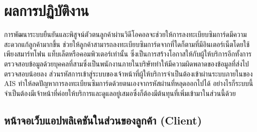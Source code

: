 \chapter{ผลการปฏิบัติงาน}
\label{chapter:result}

การพัฒนาระบบยืนยันและพิสูจน์ตัวตนลูกค้าผ่านวิดีโอคอลจะช่วยให้การลงทะเบียบซิมการ์ดมีความสะดวกแก้ลูกค้ามากขึ้น ช่วยให้ลูกค้าสามารถลงทะเบียบซิมการ์ดจากที่ใดก็ตามที่มีอินเตอร์เน็ตโดยใช้เพียงสมาร์ทโฟน แท็บเล็ตหรือคอมพิวเตอร์เท่านั้น ซึ่งเป็นการสร้างโอกาสให้กับผู้ให้บริการอีกทั้งการตรวจสอบข้อมูลด้วยบุคคลที่สามซึ่งเป็นพนักงานภายในบริษัททำให้มีความผิดพลาดของข้อมูลที่ส่งไปตรวจสอบน้อยลง ส่วนรหัสการเข้าสู่ระบบของเจ้าหน้าที่ผู้ให้บริการจำเป็นต้องเข้าผ่านระบบภายในของ AIS ทำให้ลดปัญหาการลงทะเบียนซิมการ์ดด้วยตนเองจากรหัสผ่านที่หลุดออกไปได้ อย่างไรก็ระบบนี้จำเป็นต้องมีเจ้าหน้าที่ค่อยให้บริการและดูแลอยู่เสมอซึ่งก็ต้องมีต้นทุนที่เพิ่มเข้ามาในส่วนนี้ด้วย
\section{หน้าจอเว็บแอปพลิเคชันในส่วนของลูกค้า (Client)}

